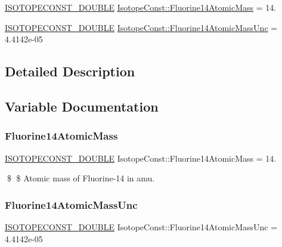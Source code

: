 \begin{DoxyCompactItemize}
\item 
\mbox{\hyperlink{group___isotope_const-_macros_ga8f45a7272ce02c0b4c65c44636ed719a}{I\+S\+O\+T\+O\+P\+E\+C\+O\+N\+S\+T\+\_\+\+D\+O\+U\+B\+LE}} \mbox{\hyperlink{group___isotope_const-_fluorine-_f14_ga0390555442f780844ad39034fcf32e26}{Isotope\+Const\+::\+Fluorine14\+Atomic\+Mass}} = 14.
\item 
\mbox{\hyperlink{group___isotope_const-_macros_ga8f45a7272ce02c0b4c65c44636ed719a}{I\+S\+O\+T\+O\+P\+E\+C\+O\+N\+S\+T\+\_\+\+D\+O\+U\+B\+LE}} \mbox{\hyperlink{group___isotope_const-_fluorine-_f14_ga646b0982ff9ecedafd5cc68147fe3af9}{Isotope\+Const\+::\+Fluorine14\+Atomic\+Mass\+Unc}} = 4.\+4142e-\/05
\end{DoxyCompactItemize}


\subsection{Detailed Description}


\subsection{Variable Documentation}
\mbox{\label{group___isotope_const-_fluorine-_f14_ga0390555442f780844ad39034fcf32e26}} 
\subsubsection{\texorpdfstring{Fluorine14\+Atomic\+Mass}{Fluorine14AtomicMass}}
{\footnotesize\ttfamily \mbox{\hyperlink{group___isotope_const-_macros_ga8f45a7272ce02c0b4c65c44636ed719a}{I\+S\+O\+T\+O\+P\+E\+C\+O\+N\+S\+T\+\_\+\+D\+O\+U\+B\+LE}} Isotope\+Const\+::\+Fluorine14\+Atomic\+Mass = 14.}

\$ \$ Atomic mass of Fluorine-\/14 in amu. \mbox{\label{group___isotope_const-_fluorine-_f14_ga646b0982ff9ecedafd5cc68147fe3af9}} 
\subsubsection{\texorpdfstring{Fluorine14\+Atomic\+Mass\+Unc}{Fluorine14AtomicMassUnc}}
{\footnotesize\ttfamily \mbox{\hyperlink{group___isotope_const-_macros_ga8f45a7272ce02c0b4c65c44636ed719a}{I\+S\+O\+T\+O\+P\+E\+C\+O\+N\+S\+T\+\_\+\+D\+O\+U\+B\+LE}} Isotope\+Const\+::\+Fluorine14\+Atomic\+Mass\+Unc = 4.\+4142e-\/05}

